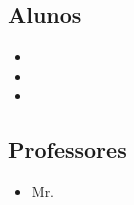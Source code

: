 

\subsection*{Alunos} %
\label{sub:alunos}
\begin{itemize}
	\item \rafael
	\item \bruno
	\item \josepedro
\end{itemize}

\subsection*{Professores} %
\label{sub:professores}

\begin{itemize}
	\item Mr. \professor
\end{itemize}
